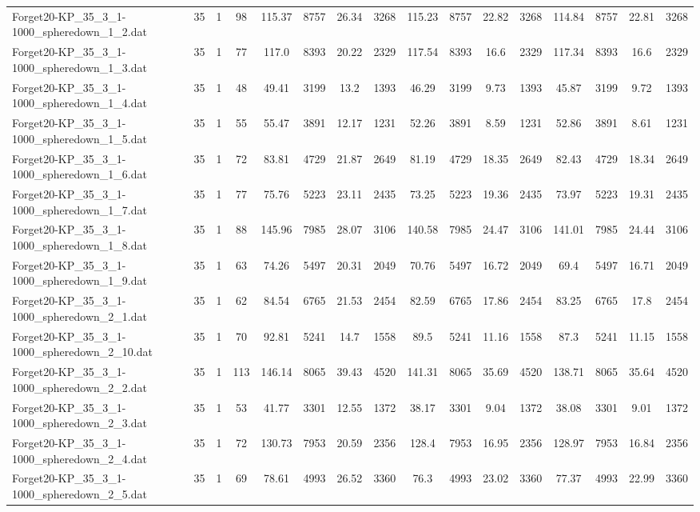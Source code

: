 \begin{sidewaystable}[!ht]
{\begin{tabular}{lccccccccccccccc}
Forget20-KP\_35\_3\_1-1000\_spheredown\_1\_2.dat & 35 & 1 & 98 & 115.37 & 8757 & 26.34 & 3268 & 115.23 & 8757 & 22.82 & 3268 & 114.84 & 8757 & 22.81 & 3268 \\
Forget20-KP\_35\_3\_1-1000\_spheredown\_1\_3.dat & 35 & 1 & 77 & 117.0 & 8393 & 20.22 & 2329 & 117.54 & 8393 & 16.6 & 2329 & 117.34 & 8393 & 16.6 & 2329 \\
Forget20-KP\_35\_3\_1-1000\_spheredown\_1\_4.dat & 35 & 1 & 48 & 49.41 & 3199 & 13.2 & 1393 & 46.29 & 3199 & 9.73 & 1393 & 45.87 & 3199 & 9.72 & 1393 \\
Forget20-KP\_35\_3\_1-1000\_spheredown\_1\_5.dat & 35 & 1 & 55 & 55.47 & 3891 & 12.17 & 1231 & 52.26 & 3891 & 8.59 & 1231 & 52.86 & 3891 & 8.61 & 1231 \\
Forget20-KP\_35\_3\_1-1000\_spheredown\_1\_6.dat & 35 & 1 & 72 & 83.81 & 4729 & 21.87 & 2649 & 81.19 & 4729 & 18.35 & 2649 & 82.43 & 4729 & 18.34 & 2649 \\
Forget20-KP\_35\_3\_1-1000\_spheredown\_1\_7.dat & 35 & 1 & 77 & 75.76 & 5223 & 23.11 & 2435 & 73.25 & 5223 & 19.36 & 2435 & 73.97 & 5223 & 19.31 & 2435 \\
Forget20-KP\_35\_3\_1-1000\_spheredown\_1\_8.dat & 35 & 1 & 88 & 145.96 & 7985 & 28.07 & 3106 & 140.58 & 7985 & 24.47 & 3106 & 141.01 & 7985 & 24.44 & 3106 \\
Forget20-KP\_35\_3\_1-1000\_spheredown\_1\_9.dat & 35 & 1 & 63 & 74.26 & 5497 & 20.31 & 2049 & 70.76 & 5497 & 16.72 & 2049 & 69.4 & 5497 & 16.71 & 2049 \\
Forget20-KP\_35\_3\_1-1000\_spheredown\_2\_1.dat & 35 & 1 & 62 & 84.54 & 6765 & 21.53 & 2454 & 82.59 & 6765 & 17.86 & 2454 & 83.25 & 6765 & 17.8 & 2454 \\
Forget20-KP\_35\_3\_1-1000\_spheredown\_2\_10.dat & 35 & 1 & 70 & 92.81 & 5241 & 14.7 & 1558 & 89.5 & 5241 & 11.16 & 1558 & 87.3 & 5241 & 11.15 & 1558 \\
Forget20-KP\_35\_3\_1-1000\_spheredown\_2\_2.dat & 35 & 1 & 113 & 146.14 & 8065 & 39.43 & 4520 & 141.31 & 8065 & 35.69 & 4520 & 138.71 & 8065 & 35.64 & 4520 \\
Forget20-KP\_35\_3\_1-1000\_spheredown\_2\_3.dat & 35 & 1 & 53 & 41.77 & 3301 & 12.55 & 1372 & 38.17 & 3301 & 9.04 & 1372 & 38.08 & 3301 & 9.01 & 1372 \\
Forget20-KP\_35\_3\_1-1000\_spheredown\_2\_4.dat & 35 & 1 & 72 & 130.73 & 7953 & 20.59 & 2356 & 128.4 & 7953 & 16.95 & 2356 & 128.97 & 7953 & 16.84 & 2356 \\
Forget20-KP\_35\_3\_1-1000\_spheredown\_2\_5.dat & 35 & 1 & 69 & 78.61 & 4993 & 26.52 & 3360 & 76.3 & 4993 & 23.02 & 3360 & 77.37 & 4993 & 22.99 & 3360 \\

\end{tabular}}
\end{sidewaystable}
